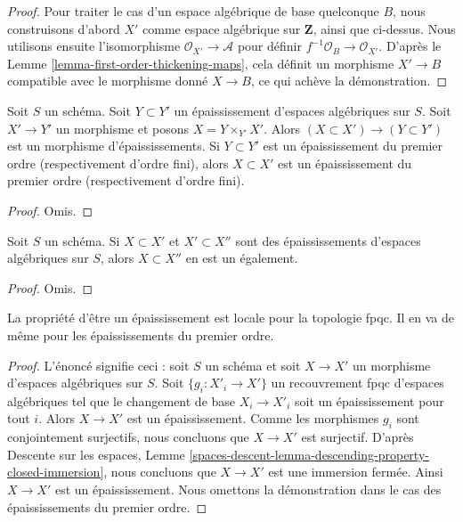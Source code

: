 \begin{proof}
\medskip\noindent
Pour traiter le cas d'un espace algébrique de base quelconque $B$, nous
construisons d'abord $X'$ comme espace algébrique sur $\mathbf{Z}$, ainsi que ci-dessus.
Nous utilisons ensuite l'isomorphisme $\mathcal{O}_{X'} \to \mathcal{A}$ pour
définir $f^{-1}\mathcal{O}_B \to \mathcal{O}_{X'}$. D'après le
Lemme \ref{lemma-first-order-thickening-maps},
cela définit un morphisme $X' \to B$ compatible avec le morphisme donné
$X \to B$, ce qui achève la démonstration.
\end{proof}

\begin{lemma}
\label{lemma-base-change-thickening}
Soit $S$ un schéma. Soit $Y \subset Y'$ un épaississement d'espaces algébriques
sur $S$. Soit $X' \to Y'$ un morphisme et posons $X = Y \times_{Y'} X'$.
Alors $(X \subset X') \to (Y \subset Y')$
est un morphisme d'épaississements. Si $Y \subset Y'$ est un épaississement du premier
ordre (respectivement d'ordre fini), alors $X \subset X'$ est un épaississement du premier
ordre (respectivement d'ordre fini).
\end{lemma}

\begin{proof}
Omis.
\end{proof}

\begin{lemma}
\label{lemma-composition-thickening}
Soit $S$ un schéma. Si $X \subset X'$ et $X' \subset X''$ sont des
épaississements d'espaces algébriques sur $S$, alors $X \subset X''$ en est un également.
\end{lemma}

\begin{proof}
Omis.
\end{proof}

\begin{lemma}
\label{lemma-descending-property-thickening}
La propriété d'être un épaississement est locale pour la topologie fpqc.
Il en va de même pour les épaississements du premier ordre.
\end{lemma}

\begin{proof}
L'énoncé signifie ceci : soit $S$ un schéma et soit
$X \to X'$ un morphisme d'espaces algébriques sur $S$.
Soit $\{g_i : X'_i \to X'\}$ un recouvrement fpqc d'espaces algébriques
tel que le changement de base $X_i \to X'_i$ soit un épaississement pour tout $i$.
Alors $X \to X'$ est un épaississement. Comme les morphismes $g_i$ sont conjointement
surjectifs, nous concluons que $X \to X'$ est surjectif. D'après
Descente sur les espaces, Lemme
\ref{spaces-descent-lemma-descending-property-closed-immersion},
nous concluons que $X \to X'$ est une immersion fermée.
Ainsi $X \to X'$ est un épaississement. Nous omettons la démonstration dans le
cas des épaississements du premier ordre.
\end{proof}








